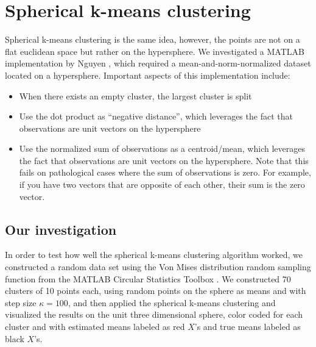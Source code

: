 \documentclass[../tech_report_1.tex]{subfiles}
\begin{document}
\section{Spherical k-means clustering}

Spherical k-means clustering is the same idea, however, the points are not on a flat euclidean space but rather on the hypersphere.
We investigated a MATLAB implementation by Nguyen \cite{nguyen2008gene,nguyen_spherical_clustering},
which required a mean-and-norm-normalized dataset located on a hypersphere.
Important aspects of this implementation include:
\begin{itemize}
\item When there exists an empty cluster, the largest cluster is split
\item Use the dot product as ``negative distance'', which leverages the
fact that observations are unit vectors on the hypersphere
\item Use the normalized sum of observations as a centroid/mean, which leverages
the fact that observations are unit vectors on the hypersphere. Note
that this fails on pathological cases where the sum of observations
is zero.
For example, if you have two vectors that are opposite of each other, their sum is the zero vector.
\end{itemize}

\subsection{Our investigation}

In order to test how well the spherical k-means clustering algorithm
worked, we constructed a random data set using the Von Mises distribution
random sampling function from the MATLAB Circular Statistics Toolbox \cite{circstats}.
We constructed 70 clusters of 10 points each, using random points
on the sphere as means and with step size $\kappa=100$, and then applied the spherical k-means clustering and visualized the results on the unit
three dimensional sphere, color coded for each cluster and with estimated
means labeled as red $X$'s and true means labeled as black $X$'s.
\end{document}
